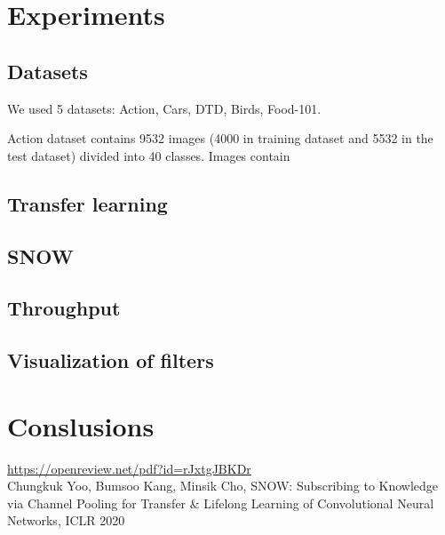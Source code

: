 \documentclass[12pt]{article}
\begin{document}
    \section{Experiments}

    \subsection{Datasets}

    We used 5 datasets: Action, Cars, DTD, Birds, Food-101.

    Action dataset contains 9532 images (4000 in training dataset and 5532 in the test dataset) divided into 40 classes.
    Images contain

    \subsection{Transfer learning}

    \subsection{SNOW}

    \subsection{Throughput}

    \subsection{Visualization of filters}


    \section{Conslusions}

    \begin{thebibliography}{99}
         \href{https://openreview.net/pdf?id=rJxtgJBKDr}{https://openreview.net/pdf?id=rJxtgJBKDr} \\
        Chungkuk Yoo, Bumsoo Kang, Minsik Cho, SNOW: Subscribing to Knowledge via Channel Pooling for Transfer \& Lifelong Learning of Convolutional Neural Networks, ICLR 2020
    \end{thebibliography}
\end{document}
